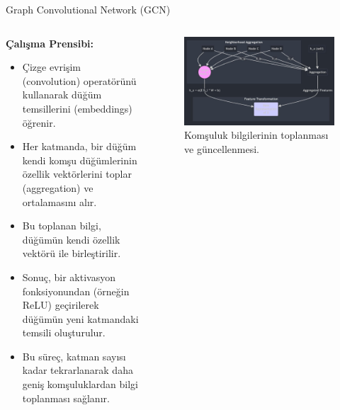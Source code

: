\documentclass{beamer}
\begin{document}
\begin{frame}{Graph Convolutional Network (GCN)}
    \begin{columns}[T]
        \begin{column}{.5\textwidth}
            \textbf{Çalışma Prensibi:}
            \begin{itemize}
                \item Çizge evrişim (convolution) operatörünü kullanarak düğüm temsillerini (embeddings) öğrenir.
                \item Her katmanda, bir düğüm kendi komşu düğümlerinin özellik vektörlerini toplar (aggregation) ve ortalamasını alır.
                \item Bu toplanan bilgi, düğümün kendi özellik vektörü ile birleştirilir.
                \item Sonuç, bir aktivasyon fonksiyonundan (örneğin ReLU) geçirilerek düğümün yeni katmandaki temsili oluşturulur.
                \item Bu süreç, katman sayısı kadar tekrarlanarak daha geniş komşuluklardan bilgi toplanması sağlanır.
            \end{itemize}
        \end{column}
        \begin{column}{.5\textwidth}
            \begin{figure}
                \includegraphics[width=\textwidth]{images/gcn_diagram.jpg}
                \caption{Komşuluk bilgilerinin toplanması ve güncellenmesi.}
            \end{figure}
        \end{column}
    \end{columns}
\end{frame}
\end{document}

